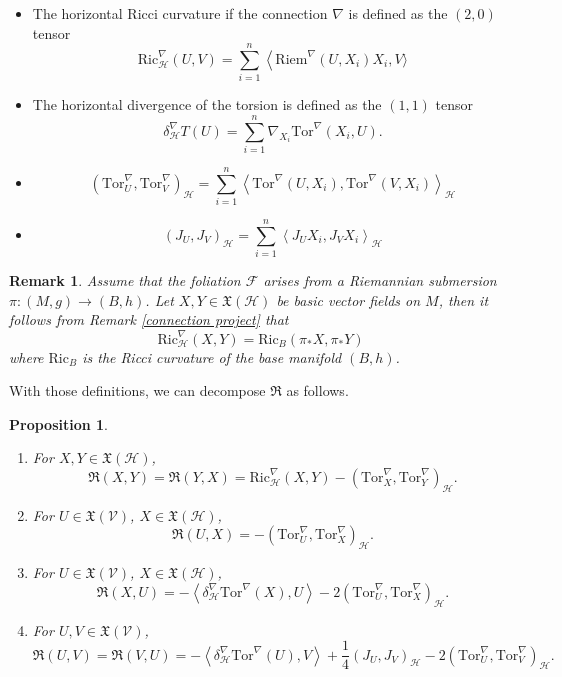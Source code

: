 \documentclass[11pt]{article}
\numberwithin{equation}{section}
\newtheorem{proposition}[theorem]{Proposition}
\newtheorem{remark}[theorem]{Remark}
\newcommand{\Ho}{\mathcal H}
\newcommand{\V}{\mathcal V}
\newcommand{\Tor}{\mathrm{Tor}}
\begin{document}
\begin{itemize}
\item The horizontal Ricci curvature if the connection $\nabla$ is defined as the $(2,0)$ tensor
\[
\mathrm{Ric}^\nabla_\Ho(U,V)=\sum_{i=1}^n  \left \langle \mathrm{Riem}^\nabla(U,X_i)X_i, V \right.\rangle
\]
\item The horizontal divergence of the torsion is defined as the $(1,1)$ tensor
\[
\delta^\nabla_\Ho T (U)= \sum_{i=1}^n \nabla_{X_i} \Tor^\nabla(X_i,U).
\]
\item
\[
(\Tor^\nabla_U ,\Tor^\nabla_V)_\Ho=\sum_{i=1}^n \left\langle \Tor^\nabla (U,X_i), \Tor^\nabla (V,X_i)\right\rangle_\Ho
\]
\item 
\[
(J_U ,J_V)_\Ho=\sum_{i=1}^n \left\langle J_U X_i , J_V X_i \right\rangle_\Ho
\]
\end{itemize}

\begin{remark}
Assume that the foliation $\mathcal{F}$ arises from a Riemannian submersion $\pi :(M,g) \to (B,h)$. Let $X,Y \in \mathfrak{X}(\Ho)$ be basic vector fields on $M$, then it follows from Remark \ref{connection project} that
\[
\mathrm{Ric}^\nabla_\Ho(X,Y)=\mathrm{Ric}_B(\pi_*X,\pi_*Y)
\]
where $\mathrm{Ric}_B$ is the Ricci curvature of the base manifold $(B,h)$.
\end{remark}


With those definitions, we can decompose $\mathfrak{R}$ as follows.

\begin{proposition}\label{example carnot r}
\
\begin{enumerate}
\item For $X,Y \in \mathfrak{X}(\Ho)$,
\[
\mathfrak{R}(X,Y)=\mathfrak{R}(Y,X)=\mathrm{Ric}^\nabla_\Ho(X,Y)-(\Tor^\nabla_X ,\Tor^\nabla_Y)_\Ho .
\]
\item For $U \in \mathfrak{X}(\V)$, $X \in \mathfrak{X}(\Ho)$,
\[
\mathfrak{R}(U,X)=-(\Tor^\nabla_U ,\Tor^\nabla_X)_\Ho .
\]
\item For $U \in \mathfrak{X}(\V)$, $X \in \mathfrak{X}(\Ho)$,
\[
\mathfrak{R}(X,U)=-\left\langle \delta_\Ho^\nabla \Tor^\nabla (X),U \right\rangle-2(\Tor^\nabla_U ,\Tor^\nabla_X)_\Ho .
\]
\item  For $U,V \in \mathfrak{X}(\V)$, 
\[
\mathfrak{R}(U,V)=\mathfrak{R}(V,U)=-\left\langle \delta_\Ho^\nabla \Tor^\nabla (U),V \right\rangle+\frac{1}{4}(J_U,J_V)_\Ho-2(\Tor^\nabla_U ,\Tor^\nabla_V)_\Ho .
\]

\end{enumerate}
\end{proposition}
\end{document}
